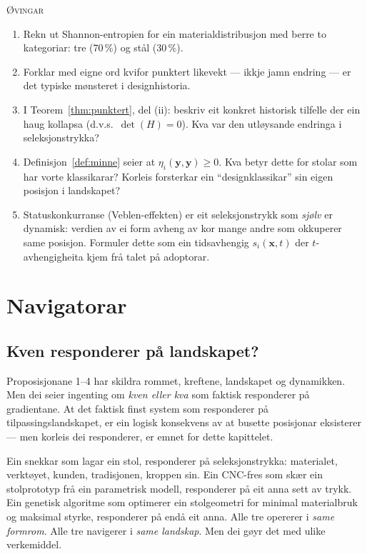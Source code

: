 \documentclass[10pt]{book}
\theoremstyle{definition}
\theoremstyle{plain}
\theoremstyle{remark}
\newenvironment{ovingar}%
  {\medskip\noindent\textsc{\O vingar}\begin{enumerate}[leftmargin=2em]}%
  {\end{enumerate}\medskip}
\begin{document}
\begin{ovingar}
  \item[\textbf{a)}] Rekn ut Shannon-entropien for ein materialdistribusjon med berre to kategoriar: tre (70\,\%) og st\aa l (30\,\%).
  \item[\textbf{a)}] Forklar med eigne ord kvifor punktert likevekt --- ikkje jamn endring --- er det typiske m\o nsteret i designhistoria.
  \item[\textbf{b)}] I Teorem~\ref{thm:punktert}, del (ii): beskriv eit konkret historisk tilfelle der ein haug kollapsa (d.v.s.\ $\det(H) = 0$). Kva var den utl\o ysande endringa i seleksjonstrykka?
  \item[\textbf{b)}] Definisjon~\ref{def:minne} seier at $\eta_i(\bm{y}, \bm{y}) \geq 0$. Kva betyr dette for stolar som har vorte klassikarar? Korleis forsterkar ein ``designklassikar'' sin eigen posisjon i landskapet?
  \item[\textbf{c)}] Statuskonkurranse (Veblen-effekten) er eit seleksjonstrykk som \emph{sj\o lv} er dynamisk: verdien av ei form avheng av kor mange andre som okkuperer same posisjon. Formuler dette som ein tidsavhengig $s_i(\bm{x}, t)$ der $t$-avhengigheita kjem fr\aa{} talet p\aa{} adoptorar.
\end{ovingar}


\chapter{Navigatorar}\label{kap:navigatorar}

\section{Kven responderer p\aa{} landskapet?}\label{sec:nav:intuisjon}

Proposisjonane 1--4 har skildra rommet, kreftene, landskapet og dynamikken. Men dei seier ingenting om \emph{kven eller kva} som faktisk responderer p\aa{} gradientane. At det faktisk finst system som responderer p\aa{} tilpassingslandskapet, er ein logisk konsekvens av at busette posisjonar eksisterer --- men korleis dei responderer, er emnet for dette kapittelet.

Ein snekkar som lagar ein stol, responderer p\aa{} seleksjonstrykka: materialet, verkt\o yet, kunden, tradisjonen, kroppen sin. Ein CNC-fres som sk\ae r ein stolprototyp fr\aa{} ein parametrisk modell, responderer p\aa{} eit anna sett av trykk. Ein genetisk algoritme som optimerer ein stolgeometri for minimal materialbruk og maksimal styrke, responderer p\aa{} endå eit anna. Alle tre opererer i \emph{same formrom}. Alle tre navigerer i \emph{same landskap}. Men dei g\o yr det med ulike verkemiddel.
\end{document}
